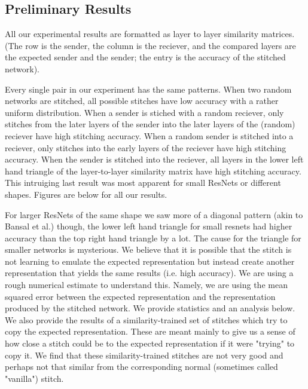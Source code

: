 \documentclass{article} %
\begin{document}
\subsection*{Preliminary Results}
All our experimental results are formatted as layer to
layer similarity matrices. (The row is the sender, the column is the reciever, and the compared layers are the expected sender
and the sender; the entry is the accuracy of the stitched network).

Every single pair in our experiment has the same
patterns. When two random networks are stitched, all possible stitches have low accuracy with a rather uniform distribution. When
a sender is stiched with a random reciever, only stitches from the later layers of the sender into the later layers of the (random)
reciever have high stitching accuracy. When a random sender is stitched into a reciever, only stitches into the early layers of the
reciever have high stitching accuracy. When the sender is stitched into the reciever, all layers in the lower left hand triangle
of the layer-to-layer similarity matrix have high stitching accuracy. 
This intruiging last result was most apparent for small ResNets or different shapes.
Figures are below for all our results.

For larger ResNets of the same shape we saw more of a diagonal pattern (akin to Bansal et al.) though, the lower left hand triangle for small
resnets had higher
accuracy than the top right hand triangle by a lot. 
The cause for the triangle for smaller networks is mysterious. We believe that
it is possible that the stitch is not learning to emulate the expected representation but instead create another representation
that yields the same results (i.e. high accuracy). We are using a rough numerical estimate to understand this. Namely, we
are using the mean squared error between the expected representation and the representation produced by the stitched network.
We provide statistics and an analysis below. We also provide the results of a similarity-trained set of stitches which
try to copy the expected representation. These are meant mainly to give us a sense of how close a stitch could be to the
expected representation if it were "trying" to copy it. We find that these similarity-trained stitches are not very good
and perhaps not that similar from the corresponding normal (sometimes called "vanilla") stitch.
\end{document}
